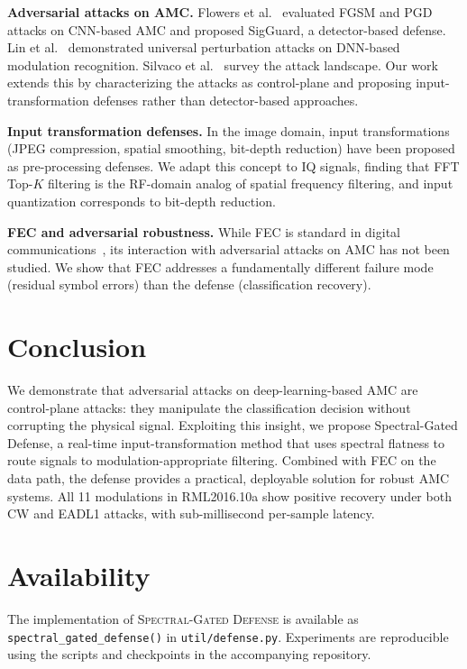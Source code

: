 \documentclass[letterpaper,twocolumn,10pt]{article}
\begin{document}
\textbf{Adversarial attacks on AMC.}
Flowers et al.~\cite{flowers2019sigguard} evaluated FGSM and PGD
attacks on CNN-based AMC and proposed SigGuard, a detector-based
defense. Lin et al.~\cite{lin2020tactics} demonstrated universal
perturbation attacks on DNN-based modulation recognition.
Silvaco et al.~\cite{silvaco2023adversarial_rf} survey the
attack landscape. Our work extends this by characterizing the
attacks as control-plane and proposing input-transformation defenses
rather than detector-based approaches.

\textbf{Input transformation defenses.}
In the image domain, input transformations (JPEG compression,
spatial smoothing, bit-depth reduction) have been proposed as
pre-processing defenses. We adapt this concept to IQ signals,
finding that FFT Top-$K$ filtering is the RF-domain analog of
spatial frequency filtering, and input quantization corresponds
to bit-depth reduction.

\textbf{FEC and adversarial robustness.}
While FEC is standard in digital communications~\cite{proakis2008digital},
its interaction with adversarial attacks on AMC has not been
studied. We show that FEC addresses a fundamentally different
failure mode (residual symbol errors) than the defense
(classification recovery).

\section{Conclusion}
\label{sec:conclusion}

We demonstrate that adversarial attacks on deep-learning-based AMC
are control-plane attacks: they manipulate the classification
decision without corrupting the physical signal. Exploiting this
insight, we propose Spectral-Gated Defense, a real-time
input-transformation method that uses spectral flatness to route
signals to modulation-appropriate filtering. Combined with FEC on
the data path, the defense provides a practical, deployable
solution for robust AMC systems. All 11 modulations in RML2016.10a
show positive recovery under both CW and EADL1 attacks, with
sub-millisecond per-sample latency.

\section*{Availability}

The implementation of \textsc{Spectral-Gated Defense} is available
as \texttt{spectral\_gated\_defense()} in \texttt{util/defense.py}.
Experiments are reproducible using the scripts and checkpoints in
the accompanying repository.




\end{document}
